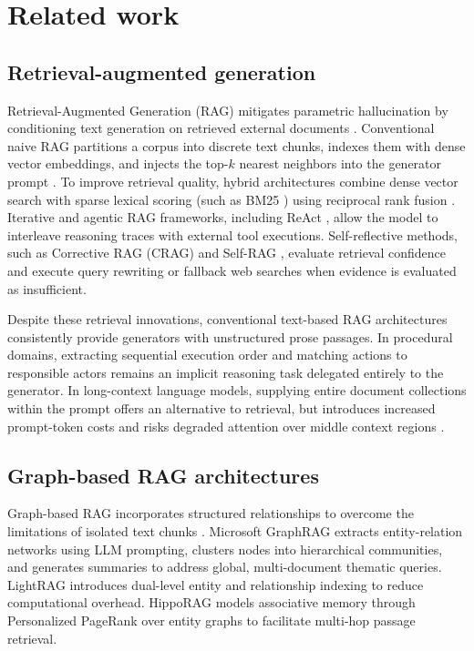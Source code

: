 \documentclass[preprint,10pt]{elsarticle}
\begin{document}
\section{Related work}
\label{sec:related}

\subsection{Retrieval-augmented generation}
Retrieval-Augmented Generation (RAG) mitigates parametric hallucination by conditioning text generation on retrieved external documents \cite{lewis2020rag}. Conventional naive RAG partitions a corpus into discrete text chunks, indexes them with dense vector embeddings, and injects the top-$k$ nearest neighbors into the generator prompt \cite{gao2023ragsurvey}. To improve retrieval quality, hybrid architectures combine dense vector search with sparse lexical scoring (such as BM25 \cite{robertson2009bm25}) using reciprocal rank fusion \cite{cormack2009rrf}. Iterative and agentic RAG frameworks, including ReAct \cite{yao2023react}, allow the model to interleave reasoning traces with external tool executions. Self-reflective methods, such as Corrective RAG (CRAG) \cite{yan2024crag} and Self-RAG \cite{asai2024selfrag}, evaluate retrieval confidence and execute query rewriting or fallback web searches when evidence is evaluated as insufficient.

Despite these retrieval innovations, conventional text-based RAG architectures consistently provide generators with unstructured prose passages. In procedural domains, extracting sequential execution order and matching actions to responsible actors remains an implicit reasoning task delegated entirely to the generator. In long-context language models, supplying entire document collections within the prompt offers an alternative to retrieval, but introduces increased prompt-token costs and risks degraded attention over middle context regions \cite{liu2024lost}.

\subsection{Graph-based RAG architectures}
Graph-based RAG incorporates structured relationships to overcome the limitations of isolated text chunks \cite{peng2024graphragsurvey,pan2024unifying}. Microsoft GraphRAG \cite{edge2024graphrag} extracts entity-relation networks using LLM prompting, clusters nodes into hierarchical communities, and generates summaries to address global, multi-document thematic queries. LightRAG \cite{guo2024lightrag} introduces dual-level entity and relationship indexing to reduce computational overhead. HippoRAG \cite{gutierrez2024hipporag} models associative memory through Personalized PageRank over entity graphs to facilitate multi-hop passage retrieval.
\end{document}
